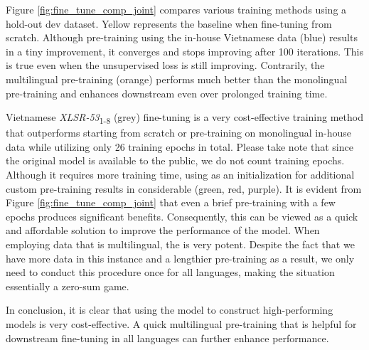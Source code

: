 Figure \ref{fig:fine_tune_comp_joint} compares various training methods using a hold-out dev dataset.
Yellow represents the baseline when fine-tuning from scratch.
Although pre-training using the in-house Vietnamese data (blue) results in a tiny improvement, it converges and stops improving after 100 iterations.
This is true even when the unsupervised loss is still improving.
Contrarily, the multilingual pre-training (orange) performs much better than the monolingual pre-training and enhances downstream  even over prolonged training time.

Vietnamese \textit{XLSR-53}\textsubscript{1-8} (grey) fine-tuning is a very cost-effective training method that outperforms starting from scratch or pre-training on monolingual in-house data while utilizing only 26 training epochs in total.
Please take note that since the original  model is available to the public, we do not count training epochs.
Although it requires more training time, using  as an initialization for additional custom pre-training results in considerable  (green, red, purple).
It is evident from Figure \ref{fig:fine_tune_comp_joint} that even a brief pre-training with a few epochs produces significant benefits.
Consequently, this can be viewed as a quick and affordable solution to improve the performance of the model.
When employing data that is multilingual, the  is very potent.
Despite the fact that we have more data in this instance and a lengthier pre-training as a result, we only need to conduct this procedure once for all languages, making the situation essentially a zero-sum game.

In conclusion, it is clear that using the  model to construct high-performing  models is very cost-effective. 
A quick multilingual pre-training that is helpful for downstream fine-tuning in all languages can further enhance performance.